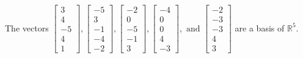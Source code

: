 \begin{exercise}
\begin{exerciseStatement}
  \end{exerciseStatement}
  \begin{exerciseAnswer}
   The vectors \(\left[\begin{array}{r}
3 \\
4 \\
-5 \\
4 \\
1
\end{array}\right] , \left[\begin{array}{r}
-5 \\
3 \\
-1 \\
-4 \\
-2
\end{array}\right] , \left[\begin{array}{r}
-2 \\
0 \\
-5 \\
-1 \\
3
\end{array}\right] , \left[\begin{array}{r}
-4 \\
0 \\
0 \\
4 \\
-3
\end{array}\right] , \text{ and } \left[\begin{array}{r}
-2 \\
-3 \\
-3 \\
4 \\
3
\end{array}\right]\) 
  	 are  a basis of \(\mathbb{R}^5\).
  


  \end{exerciseAnswer}
\end{exercise}